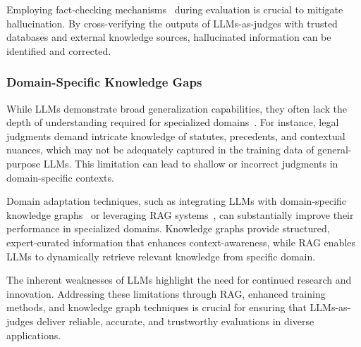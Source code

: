 Employing fact-checking mechanisms~\cite{dierickx2024striking,ji2023survey,tonmoy2024comprehensive} during evaluation is crucial to mitigate hallucination. By cross-verifying the outputs of LLMs-as-judges with trusted databases and external knowledge sources, hallucinated information can be identified and corrected. 



\subsubsection{Domain-Specific Knowledge Gaps}
\label{sec:Domain-Specific Knowledge Gaps}
While LLMs demonstrate broad generalization capabilities, they often lack the depth of understanding required for specialized domains~\cite{feng2023knowledge,pan2024unifying,szymanski2024limitations,dorner2024limitsscalableevaluationfrontier}. For instance, legal judgments demand intricate knowledge of statutes, precedents, and contextual nuances, which may not be adequately captured in the training data of general-purpose LLMs. This limitation can lead to shallow or incorrect judgments in domain-specific contexts.

Domain adaptation techniques, such as integrating LLMs with domain-specific knowledge graphs~\cite{feng2023knowledge,pan2024unifying} or leveraging RAG systems~\cite{gao2023retrieval}, can substantially improve their performance in specialized domains. Knowledge graphs provide structured, expert-curated information that enhances context-awareness, while RAG enables LLMs to dynamically retrieve relevant knowledge from specific domain. 


The inherent weaknesses of LLMs highlight the need for continued research and innovation. Addressing these limitations through RAG, enhanced training methods, and knowledge graph techniques is crucial for ensuring that LLMs-as-judges deliver reliable, accurate, and trustworthy evaluations in diverse applications.

